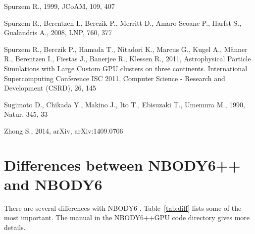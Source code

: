 \documentclass[usenatbib,aas_macros]{mn2e}
\def\nbody{NBODY6 }
\def\nbodypp{NBODY6++ }
\def\nbodyppgpu{NBODY6++GPU }
\begin{document}
\begin{thebibliography}{999}
Spurzem R., 1999, JCoAM, 109, 407 

 Spurzem R., Berentzen I., Berczik P., 
Merritt D., Amaro-Seoane P., Harfst S., Gualandris A., 2008, LNP, 760, 377 

Spurzem R., Berczik P., Hamada T., Nitadori K., Marcus G., Kugel A., M{\"a}nner R.,
Berentzen I., Fiestas J., Banerjee R., Klessen R., 2011, Astrophysical Particle Simulations
with Large Custom GPU clusters on three continents. International Supercomputing
Conference ISC 2011, Computer Science - Research and Development (CSRD), 26, 145

 Sugimoto D., Chikada Y., Makino J., Ito 
T., Ebisuzaki T., Umemura M., 1990, Natur, 345, 33 

 Zhong 
S., 2014, arXiv, arXiv:1409.0706 

\end{thebibliography}

\onecolumn
\appendix
\section{Differences between \nbodypp and \nbody}
There are several differences with \nbody. 
Table~\ref{tab:diff} lists some of the most important. 
The manual in the \nbodyppgpu code directory gives more details.
\newline
\end{document}
